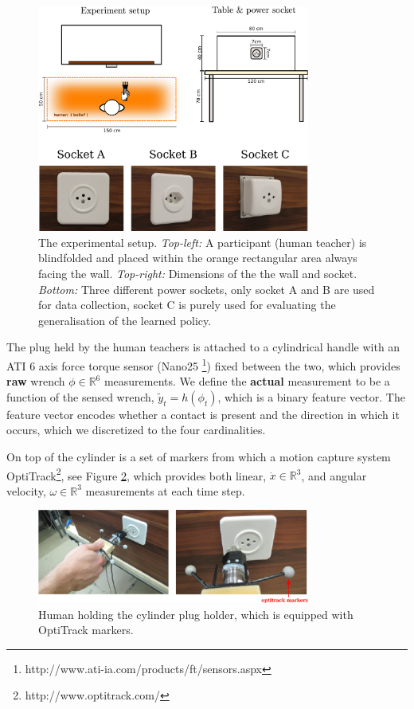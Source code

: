 \begin{figure}
 \centering
 \includegraphics[width=0.8\textwidth]{./ch4-PiH/Figures/Fig/experiment_setup_and_design.pdf}
 \caption{The experimental setup. \textit{Top-left:} A participant (human teacher) is blindfolded and 
    placed within the orange rectangular area always facing the wall. \textit{Top-right:} Dimensions of the 
    the wall and socket. \textit{Bottom:} Three different power sockets, only socket A and B are used for data collection, socket
    C is purely used for evaluating the generalisation of the learned policy.}
    \label{fig:search_task_setup}
\end{figure}

The plug held by the human teachers is attached to a cylindrical handle with 
an ATI 6 axis force torque sensor (Nano25 \footnote{http://www.ati-ia.com/products/ft/sensors.aspx}) fixed 
between the two, which provides \textbf{raw} wrench $\phi \in \mathbb{R}^6$ measurements.
 We define the \textbf{actual} measurement to be a function of the sensed wrench, 
$\tilde{y}_t = h(\phi_t)$, which is a binary feature vector. The feature vector encodes whether a contact is present 
and the direction in which it occurs, which we discretized to the four cardinalities.

On top of the cylinder is a set of markers from which a motion capture system OptiTrack\footnote{http://www.optitrack.com/}, see Figure \ref{fig:plug_cylinder}, 
which provides both linear, $\dot{x} \in \mathbb{R}^3$, and angular velocity, $\omega \in \mathbb{R}^3$ measurements at each time step.

\begin{figure}
 \centering
 \includegraphics[width=0.8\textwidth]{./ch4-PiH/Figures/Fig/plug_socket_closeup.pdf}
 \caption{Human holding the cylinder plug holder, which is equipped with OptiTrack markers.}
 \label{fig:plug_cylinder}
\end{figure}

